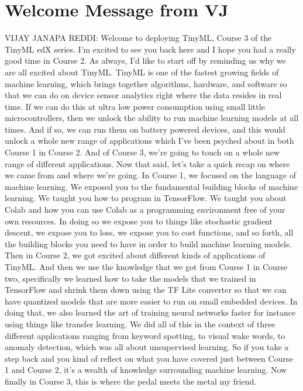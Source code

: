 \section{Welcome Message from VJ}

VIJAY JANAPA REDDI: Welcome to deploying TinyML, Course 3 of the TinyML edX
series.
I'm excited to see you back here and I hope
you had a really good time in Course 2.
As always, I'd like to start off by reminding us
why we are all excited about TinyML.
TinyML is one of the fastest growing fields of machine learning, which
brings together algorithms, hardware, and software so
that we can do on device sensor analytics
right where the data resides in real time.
If we can do this at ultra low power consumption using
small little microcontrollers, then we unlock
the ability to run machine learning models at all times.
And if so, we can run them on battery powered devices,
and this would unlock a whole new range of applications which I've been psyched
about in both Course 1 in Course 2.
And of Course 3, we're going to touch on a whole new range
of different applications.
Now that said, let's take a quick recap on where we came from
and where we're going.
In Course 1, we focused on the language of machine learning.
We exposed you to the fundamental building blocks of machine learning.
We taught you how to program in TensorFlow.
We taught you about Colab and how you can use Colab as a programming
environment free of your own resources.
In doing so we expose you to things like stochastic gradient descent,
we expose you to loss, we expose you to cost functions,
and so forth, all the building blocks you
need to have in order to build machine learning models.
Then in Course 2, we got excited about different kinds
of applications of TinyML.
And then we use the knowledge that we got from Course 1 in Course two,
specifically we learned how to take the models that we trained in TensorFlow
and shrink them down using the TF Lite converter so that we
can have quantized models that are more easier
to run on small embedded devices.
In doing that, we also learned the art of training
neural networks faster for instance using things like transfer learning.
We did all of this in the context of three different applications ranging
from keyword spotting, to visual wake words,
to anomaly detection, which was all about unsupervised learning.
So if you take a step back and you kind of
reflect on what you have covered just between Course 1 and Course 2,
it's a wealth of knowledge surrounding machine learning.
Now finally in Course 3, this is where the pedal meets the metal my friend.
